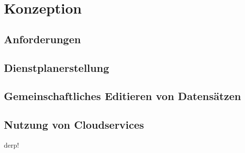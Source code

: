 
\section{Konzeption} \label{sec:konzeption}

\subsection{Anforderungen}

\subsection{Dienstplanerstellung}

\subsection{Gemeinschaftliches Editieren von Datensätzen} \label{subsec:ge}


\subsection{Nutzung von Cloudservices}
derp!
